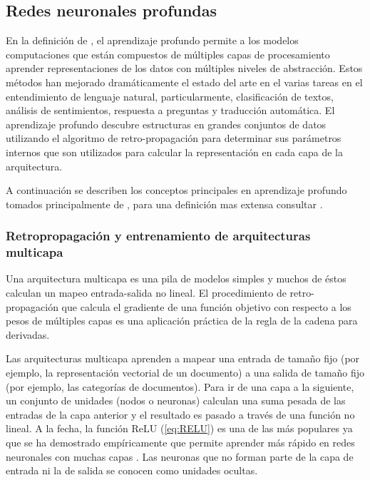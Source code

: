\subsection{Redes neuronales profundas}

En la definición de \citep{lecun2015deep}, el aprendizaje profundo permite a los modelos computaciones que están compuestos de múltiples capas de procesamiento aprender representaciones de los datos con múltiples niveles de abstracción. Estos métodos han mejorado dramáticamente el estado del arte en el varias tareas en el entendimiento de lenguaje natural, particularmente, clasificación de textos, análisis de sentimientos, respuesta a preguntas y traducción automática. El aprendizaje profundo descubre estructuras en grandes conjuntos de datos utilizando el algoritmo de retro-propagación para determinar sus parámetros internos que son utilizados para calcular la representación en cada capa de la arquitectura.

A continuación se describen los conceptos principales en aprendizaje profundo tomados principalmente de \citep{lecun2015deep}, para una definición mas extensa consultar \citep{kamath2019deep, goodfellow2016deep}.

\subsubsection{Retropropagación y entrenamiento de arquitecturas multicapa}

Una arquitectura multicapa es una pila de modelos simples y muchos de éstos calculan un mapeo entrada-salida no lineal. El procedimiento de retro-propagación que calcula el gradiente de una función objetivo con respecto a los pesos de múltiples capas es una aplicación práctica de la regla de la cadena para derivadas.

Las arquitecturas multicapa aprenden a mapear una entrada de tamaño fijo (por ejemplo, la representación vectorial de un documento) a una salida de tamaño fijo (por ejemplo, las categorías de documentos). Para ir de una capa a la siguiente, un conjunto de unidades (nodos o neuronas) calculan una suma pesada de las entradas de la capa anterior y el resultado es pasado a través de una función no lineal. A la fecha, la función ReLU (\ref{eq:RELU})  es una de las más populares ya que se ha demostrado empíricamente que permite aprender más rápido en redes neuronales con muchas capas \citep{glorot2011deep}. Las neuronas que no forman parte de la capa de entrada ni la de salida se conocen como unidades ocultas. 

